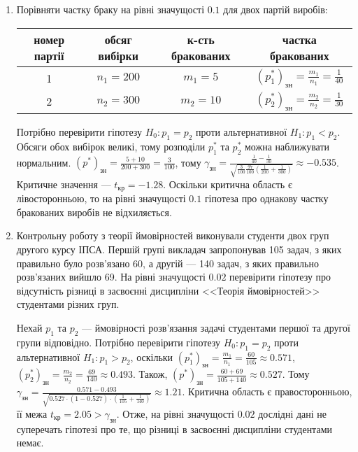 \begin{example}
    \begin{enumerate}
        \item Порівняти частку браку на рівні значущості $0.1$ для двох партій виробів:
        
        \begin{center}
            \begin{tabular}{|c|c|c|c|}
                \hline
                номер партії & обсяг вибірки & к-сть бракованих & частка бракованих \\
                \hline
                1 & $n_1 = 200$ & $m_1 = 5$ & $(p_1^*)_\text{зн} = \frac{m_1}{n_1} = \frac{1}{40}$ \\ 
                \hline
                2 & $n_2 = 300$ & $m_2 = 10$ & $(p_2^*)_\text{зн} = \frac{m_2}{n_2} = \frac{1}{30}$ \\
                \hline 
            \end{tabular}
        \end{center}

        Потрібно перевірити гіпотезу $H_0: p_1 = p_2$ проти альтернативної
        $H_1: p_1 < p_2$. Обсяги обох вибірок великі, тому розподіли $p_1^*$ та
        $p_2^*$ можна наближувати нормальним. $(p^*)_\text{зн} = \frac{5 + 10}{200 + 300} = \frac{3}{100}$, тому
        $\gamma_\text{зн} = \frac{\frac{1}{40} - \frac{1}{30}}{
            \sqrt{\frac{3}{100} \frac{97}{100} \left(\frac{1}{200} + \frac{1}{300}\right)}
            } \approx -0.535$. Критичне значення --- $t_\text{кр} = -1.28$.
            Оскільки критична область є лівосторонньою, то на рівні значущості $0.1$ гіпотеза
            про однакову частку бракованих виробів не відхиляється.
            \item Контрольну роботу з теорії ймовірностей виконували студенти двох груп другого курсу ІПСА.
            Першій групі викладач запропонував 105 задач, з яких правильно було розв'язано 60, а другій --- 140 задач, з яких правильно
            розв'язаних вийшло 69. На рівні значущості $0.02$ перевірити гіпотезу про відсутність різниці в засвоєнні дисципліни 
            <<Теорія ймовірностей>> студентами різних груп.

            Нехай $p_1$ та $p_2$ --- ймовірності розв'язання задачі студентами першої та другої групи відповідно. Потрібно перевірити
            гіпотезу $H_0: p_1 = p_2$ проти альтернативної $H_1: p_1 > p_2$, оскільки
            $(p_1^*)_\text{зн} = \frac{m_1}{n_1} = \frac{60}{105} \approx 0.571$,
            $(p_2^*)_\text{зн} = \frac{m_2}{n_2} = \frac{69}{140} \approx 0.493$.
            Також, $(p^*)_\text{зн} = \frac{60 + 69}{105 + 140} \approx 0.527$.
            Тому 
            $\gamma_\text{зн} = \frac{0.571 - 0.493}{\sqrt{0.527\cdot(1-0.527)\cdot\left(\frac{1}{105} + \frac{1}{140}\right)}} \approx 1.21$.
            Критична область є правосторонньою, її межа $t_\text{кр} = 2.05 > \gamma_\text{зн}$.
            Отже, на рівні значущості $0.02$ дослідні дані не суперечать гіпотезі про те, що різниці в засвоєнні
            дисципліни студентами немає.
    \end{enumerate}
\end{example}